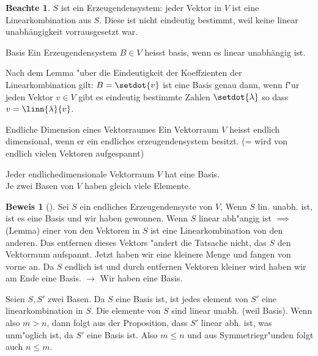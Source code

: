 \documentclass[oneside,fontsize=11pt,paper=a4,BCOR=0mm,DIV=12,automark,headsepline]{scrbook}
\theoremstyle{remark}
\theoremstyle{definition}
\newtheorem*{notte}{Beachte}
\theoremstyle{definition}
\newtheorem*{prof}{Beweis}
\theoremstyle{remark}
\begin{document}
\begin{notte}
  $S$ ist ein Erzeugendensystem: jeder Vektor in \(V\) ist eine
  Linearkombination aus $S$. Diese ist nicht eindeutig bestimmt, weil
  keine linear unabhängigkeit vorrausgesetzt war.
\end{notte}

\begin{definition}{Basis}{}
  Ein Erzeugendensystem \(B\in V\) heisst basis, wenn es linear unabhängig ist. 
\end{definition}
\begin{relation}
  Nach dem Lemma "uber die Eindeutigkeit der Koeffzienten der
  Linearkombination gilt: \(B=\setdot{v}\) ist eine Basis genau
  dann, wenn f"ur jeden Vektor \(v \in V\) gibt es eindeutig bestimmte
  Zahlen $\setdot{\lambda}$ so dass $v=\linn{\lambda}{v}$.
\end{relation}

\begin{definition}{Endliche Dimension eines Vektorraumes}{}
  Ein Vektorraum \(V\) heisst endlich dimensional, wenn er ein endliches
  erzeugendensystem besitzt. (= wird von endlich vielen Vektoren aufgespannt)
\end{definition}

\begin{theo}{}{}
  Jeder endlichedimensionale Vektorraum \(V\)  hat eine Basis.\\ Je zwei Basen von \(V\)
  haben gleich viele Elemente.
\end{theo}

\begin{prof}[]
  Sei \(S\) ein endliches Erzeugendensyste von \(V\), Wenn \(S\) lin. unabh. ist, ist es
  eine Basis und wir haben gewonnen. Wenn \(S\) linear abh"angig ist $\implies$
  (Lemma) einer von den Vektoren in \(S\) ist eine Linearkombination von den
  anderen. Das entfernen dieses Vektors "andert die Tatsache nicht, das \(S\) den
  Vektorraum aufspannt. Jetzt haben wir eine kleinere Menge und fangen von vorne
  an. Da \(S\) endlich ist und durch entfernen Vektoren kleiner wird haben wir am
  Ende eine Basis.
  \(\rightarrow\) Wir haben eine Basis.

  Seien \(S, S'\) zwei Basen. Da \(S\) eine Basis ist, ist jedes element von \(S'\) eine
  linearkombination in \(S\). Die elemente von \(S\) sind linear unabh. (weil Basis).
  Wenn also \(m>n\), dann folgt aus der Proposition, dass \(S'\) linear abh. ist, was
  unm"oglich ist, da \(S'\) eine Basis ist. Also \(m \leq n\) und aus Symmetriegr"unden folgt auch \(n \leq m\).
\end{prof}
\end{document}
